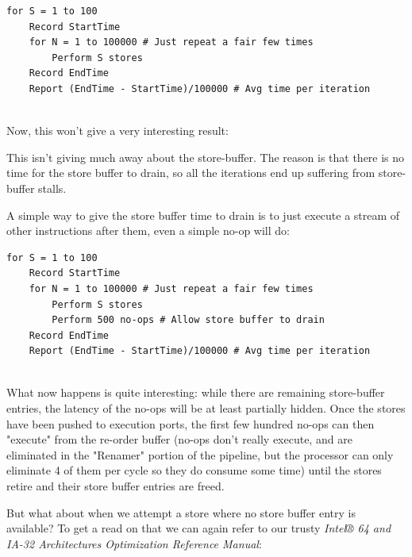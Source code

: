 \documentclass[11pt]{article}
\begin{document}
\begin{lstlisting}
for S = 1 to 100 
    Record StartTime
    for N = 1 to 100000 # Just repeat a fair few times
        Perform S stores
    Record EndTime
    Report (EndTime - StartTime)/100000 # Avg time per iteration 
 
\end{lstlisting}

Now, this won't give a very interesting result:

\begin{center}\end{center}

This isn't giving much away about the store-buffer. The reason is that there is no time for the store buffer to drain, so all the iterations end up suffering from store-buffer stalls.

A simple way to give the store buffer time to drain is to just execute a stream of other instructions after them, even a simple no-op will do:

\begin{lstlisting}
for S = 1 to 100 
    Record StartTime
    for N = 1 to 100000 # Just repeat a fair few times
        Perform S stores
        Perform 500 no-ops # Allow store buffer to drain
    Record EndTime
    Report (EndTime - StartTime)/100000 # Avg time per iteration 
 
\end{lstlisting}

What now happens is quite interesting: while there are remaining store-buffer entries, the latency of the no-ops will be at least partially hidden. Once the stores have been pushed to execution ports, the first few hundred no-ops can then "execute" from the re-order buffer (no-ops don't really execute, and are eliminated in the "Renamer" portion of the pipeline, but the processor can only eliminate 4 of them per cycle so they do consume some time) until the stores retire and their store buffer entries are freed.

But what about when we attempt a store where no store buffer entry is available?
To get a read on that we can again refer to our trusty \emph{Intel® 64 and IA-32 Architectures Optimization Reference Manual}:
\end{document}

